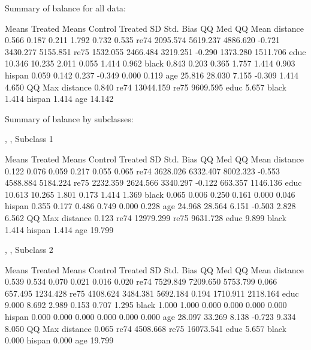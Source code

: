 \documentclass[oneside,letterpaper,titlepage]{article}
\begin{document}
\begin{enumerate}
\begin{Schunk}
\begin{Soutput}
Summary of balance for all data:

         Means Treated Means Control Treated SD Std. Bias   QQ Med  QQ Mean
distance         0.566         0.187      0.211     1.792    0.732    0.535
re74          2095.574      5619.237   4886.620    -0.721 3430.277 5155.851
re75          1532.055      2466.484   3219.251    -0.290 1373.280 1511.706
educ            10.346        10.235      2.011     0.055    1.414    0.962
black            0.843         0.203      0.365     1.757    1.414    0.903
hispan           0.059         0.142      0.237    -0.349    0.000    0.119
age             25.816        28.030      7.155    -0.309    1.414    4.650
            QQ Max
distance     0.840
re74     13044.159
re75      9609.595
educ         5.657
black        1.414
hispan       1.414
age         14.142


Summary of balance by subclasses:

, , Subclass 1

         Means Treated Means Control Treated SD Std. Bias    QQ Med   QQ Mean
distance         0.122         0.076      0.059     0.217     0.055     0.065
re74          3628.026      6332.407   8002.323    -0.553  4588.884  5184.224
re75          2232.359      2624.566   3340.297    -0.122   663.357  1146.136
educ            10.613        10.265      1.801     0.173     1.414     1.369
black            0.065         0.006      0.250     0.161     0.000     0.046
hispan           0.355         0.177      0.486     0.749     0.000     0.228
age             24.968        28.564      6.151    -0.503     2.828     6.562
            QQ Max
distance     0.123
re74     12979.299
re75      9631.728
educ         9.899
black        1.414
hispan       1.414
age         19.799

, , Subclass 2

         Means Treated Means Control Treated SD Std. Bias    QQ Med   QQ Mean
distance         0.539         0.534      0.070     0.021     0.016     0.020
re74          7529.849      7209.650   5753.799     0.066   657.495  1234.428
re75          4108.624      3484.381   5692.184     0.194  1710.911  2118.164
educ             9.000         8.692      2.989     0.153     0.707     1.295
black            1.000         1.000      0.000     0.000     0.000     0.000
hispan           0.000         0.000      0.000     0.000     0.000     0.000
age             28.097        33.269      8.138    -0.723     9.334     8.050
            QQ Max
distance     0.065
re74      4508.668
re75     16073.541
educ         5.657
black        0.000
hispan       0.000
age         19.799


\end{Soutput}
\end{Schunk}
\end{enumerate}
\end{document}
